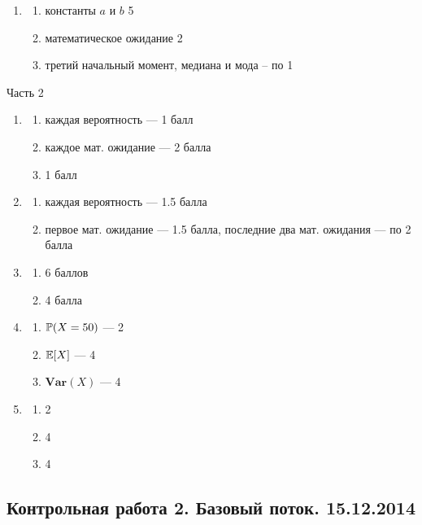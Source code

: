 \documentclass[12pt, a4paper]{article}\usepackage[]{graphicx}\usepackage[]{color}
\begin{document}
\begin{enumerate}
\begin{enumerate}
\end{enumerate}

\item
\begin{enumerate}
\item константы $a$ и $b$ 5
\item математическое ожидание 2
\item третий начальный момент, медиана и мода -- по 1
\end{enumerate}
\end{enumerate}

Часть 2

\begin{enumerate}
\item
\begin{enumerate}
\item каждая вероятность — 1 балл
\item каждое мат. ожидание — 2 балла
\item 1 балл
\end{enumerate}

\item
\begin{enumerate}
\item каждая вероятность — 1.5 балла
\item первое мат. ожидание — 1.5 балла, последние два мат. ожидания — по 2 балла

\end{enumerate}

\item
\begin{enumerate}
\item 6 баллов
\item 4 балла
\end{enumerate}
\item
\begin{enumerate}
\item $\P(X=50)$ — 2
\item $\E[X]$ — 4
\item $\mathbf{Var}(X)$ — 4
\end{enumerate}

\item
\begin{enumerate}
\item 2
\item 4
\item 4
\end{enumerate}
\end{enumerate}


\subsection{Контрольная работа 2. Базовый поток. 15.12.2014}
\end{document}
